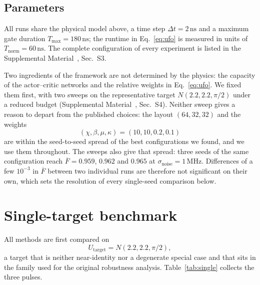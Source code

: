 \documentclass[aps,prx,twocolumn,superscriptaddress,nofootinbib,amsmath,amssymb,floatfix]{revtex4-2}
\newcommand{\Ntgt}[2]{N(#1,#1,#2)}
\newcommand{\Utgt}{U_{\mathrm{target}}}
\newcommand{\Fbar}{\overline{F}}
\newcommand{\snoise}{\sigma_{\mathrm{noise}}}
\newcommand{\ns}{\,\mathrm{ns}}
\newcommand{\MHz}{\,\mathrm{MHz}}
\begin{document}
\subsection{Parameters}
\label{sec:params}
\label{sec:modelsel}

All runs share the physical model above, a time step $\Delta t=2\ns$ and a maximum gate duration
$T_{\max}=180\ns$; the runtime in Eq.~\eqref{eq:ufo} is measured in units of $T_{\mathrm{norm}}=60\ns$.
The complete configuration of every experiment is listed in the Supplemental Material~\cite{supp}, Sec.~S3.

Two ingredients of the framework are not determined by the physics: the capacity of the actor--critic
networks and the relative weights in Eq.~\eqref{eq:ufo}. We fixed them first, with two sweeps on the
representative target $\Ntgt{2.2}{\pi/2}$ under a reduced budget (Supplemental Material~\cite{supp}, Sec.~S4). Neither
sweep gives a reason to depart from the published choices: the layout $(64,32,32)$ and the weights
\begin{equation}
(\chi,\beta,\mu,\kappa)=(10,10,0.2,0.1)
\label{eq:weights}
\end{equation}
are within the seed-to-seed spread of the best configurations we found, and we use them throughout. The
sweeps also give that spread: three seeds of the same configuration reach $\Fbar=0.959$, $0.962$ and
$0.965$ at $\snoise=1\MHz$. Differences of a few $10^{-3}$ in $\Fbar$ between two individual runs are
therefore not significant on their own, which sets the resolution of every single-seed comparison below.

\section{Single-target benchmark}
\label{sec:single}

All methods are first compared on
\begin{equation}
\Utgt=\Ntgt{2.2}{\pi/2},
\label{eq:target}
\end{equation}
a target that is neither near-identity nor a degenerate special case and that sits in the family used for
the original robustness analysis. Table~\ref{tab:single} collects the three pulses.
\end{document}
